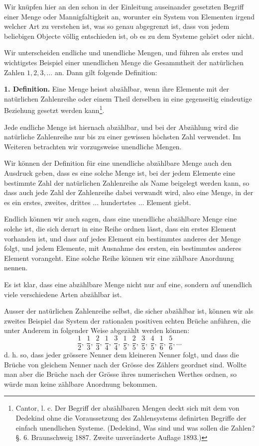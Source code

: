 \documentclass[11pt]{article}
\begin{document}
Wir knüpfen hier an den schon in der Einleitung auseinander gesetzten Begriff einer Menge oder Mannigfaltigkeit an, worunter ein System von Elementen irgend welcher Art zu verstehen ist, was so genau abgegrenzt ist, dass von jedem beliebigen Objecte völlig entschieden ist, ob es zu dem Systeme gehört oder nicht.

Wir unterscheiden endliche und unendliche Mengen, und führen als erstes und wichtigstes Beispiel einer unendlichen Menge die Gesammtheit der natürlichen Zahlen $1,2,3,\ldots$ an. Dann gilt folgende Definition:

\textbf{1. Definition.} Eine Menge heisst abzählbar, wenn ihre Elemente mit der natürlichen Zahlenreihe
oder einem Theil derselben in eine gegenseitig eindeutige Beziehung gesetzt werden kann\footnote{Cantor, l. c. Der Begriff der abzählbaren Mengen deckt sich mit dem von Dedekind ohne die Voraussetzung des Zahlensystems definirten Begriffe der einfach unendlichen Systeme. (Dedekind, Was sind und was sollen die Zahlen? §. 6. Braunschweig 1887. Zweite unveränderte Auflage 1893.)}.

Jede endliche Menge ist hiernach abzählbar, und bei der Abzählung wird die natürliche Zahlenreihe nur bis zu einer gewissen höchsten Zahl verwendet. Im Weiteren betrachten wir vorzugsweise unendliche Mengen.

Wir können der Definition für eine unendliche abzählbare Menge auch den Ausdruck geben, dass es eine solche Menge ist, bei der jedem Elemente eine bestimmte Zahl der natürlichen Zahlenreihe als Name beigelegt werden kann, so dass auch jede Zahl der Zahlenreihe dabei verwandt wird, also eine Menge, in der es ein erstes, zweites, drittes $\ldots$ hundertstes $\ldots$ Element giebt.

Endlich können wir auch sagen, dass eine unendliche abzählbare Menge eine solche ist, die sich derart in eine Reihe ordnen lässt, dass ein erstes Element vorhanden ist, und dass auf jedes Element ein bestimmtes anderes der Menge folgt, und jedem Elemente, mit Ausnahme des ersten, ein bestimmtes anderes Element vorangeht. Eine solche Reihe können wir eine zählbare Anordnung nennen.

Es ist klar, dass eine abzählbare Menge nicht nur auf eine, sondern auf unendlich viele verschiedene Arten abzählbar ist.

Ausser der natürlichen Zahlenreihe selbst, die sicher abzählbar ist, können wir als zweites Beispiel das System der rationalen positiven echten Brüche anführen, die unter Anderem in folgender Weise abgezählt werden können:
\[
\frac12,\ \frac13,\ \frac23,\ \frac14,\ \frac34,\ \frac15,\ \frac25,\ \frac35,\ \frac45,\ \frac16,\ \frac56,\ldots
\]
d. h. so, dass jeder grössere Nenner dem kleineren Nenner folgt, und dass die Brüche von gleichem Nenner nach der Grösse des Zählers geordnet sind. Wollte man aber die Brüche nach der Grösse ihres numerischen Werthes ordnen, so würde man keine zählbare Anordnung bekommen.
\end{document}
